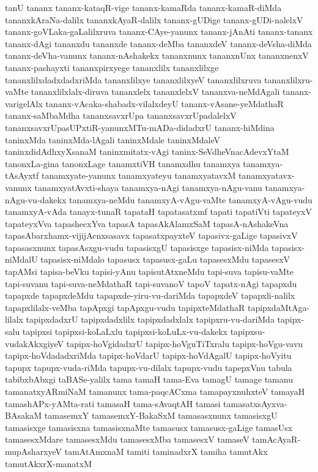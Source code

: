 {tanU
tananx
tananx-kataqR-vige
tananx-kamaRda
tananx-kamaR-diMda
tananxkAraNa-dalilx
tananxkAyaR-dalilx
tananx-gUDige
tananx-gUDi-nalelxV
tananx-goVLaka-gaLalilxruva
tananx-CAye-yanunx
tananx-jAnAti
tananx-tananx
tananx-dAgi
tananxdu
tananxde
tananx-deMba
tananxdeV
tananx-deVsha-diMda
tananx-deVha-vanunx
tananx-nAshakekx
tananxnunx
tananxnUnx
tananxnenxV
tananx-pashayxti
tananxpirxyege
tananxlilx
tananxlilxge
tananxlilxdadxdadxriMda
tananxlilxye
tananxlilxyeV
tananxlilxruva
tananxlilxru-vaMte
tananxlilxlalx-diruva
tananxlelx
tananxlelxV
tananxva-neMdAgali
tananx-varigelAlx
tananx-vAcaka-shabadx-vilalxdeyU
tananx-vAsane-yeMdathaR
tananx-saMbaMdha
tananxsavxrUpa
tananxsavxrUpadalelxV
tananxsavxrUpasUPxtiR-yanunxMTu-mADa-didadxrU
tananx-hiMdina
taninxMda
taninxMda-lAgali
taninxMdale
taninxMdaleV
taninxdidAdhxyXsanaM
taninxmitatx-vAgi
taninx-SeVdheVnacAdevxYtaM
tanonxLa-gina
tanonxLage
tanamxtiVH
tanamxdhu
tanamxya
tanamxya-tAsAyxtf
tanamxyate-yanunx
tanamxyateyu
tanamxyatavxM
tanamxyatavx-vanunx
tanamxyatAvxti-shaya
tanamxya-nAgi
tanamxya-nAgu-vanu
tanamxya-nAgu-vu-dakekx
tanamxya-neMdu
tanamxyA-vAgu-vaMte
tanamxyA-vAgu-vudu
tanamxyA-vAda
tanayx-tunaR
tapataH
tapatasatxmf
tapati
tapatiVti
tapateyxV
tapateyxVva
tapashecxYva
tapasA
tapasAkAlamxSaM
tapasA-nAshakeVna
tapasAbarxhamx-vijijAcnxsasavx
tapasatxpayxteV
tapasivx-gaLige
tapasivxV
tapasasxnunx
tapasAsxgu-vudu
tapasisxgU
tapasisxge
tapasisx-niMda
tapasisx-niMdalU
tapasisx-niMdalo
tapasusx
tapasusx-gaLu
tapasesxMdu
tapasesxV
tapAMsi
tapisa-beVku
tapisi-yAnu
tapisutAtxneMdu
tapi-suva
tapisu-vaMte
tapi-suvanu
tapi-suva-neMdathaR
tapi-suvanoV
tapoV
tapatx-nAgi
tapapxdu
tapapxde
tapapxdeMdu
tapapxde-yiru-vu-dariMda
tapapxdeV
tapapxli-nalilx
tapapxlilalx-veMba
tapApxgi
tapApxgu-vudu
tapipxteMdathaR
tapipxdaMtAga-lilalx
tapipxdadxrU
tapipxdadxlilx
tapipxdadxlalx
tapipxru-vu-dariMda
tapipx-salu
tapipxsi
tapipxsi-koLaLxlu
tapipxsi-koLuLx-vu-dakekx
tapipxsu-vudakAkxgiyeV
tapipx-hoVgidadxrU
tapipx-hoVguTiTxralu
tapipx-hoVgu-vavu
tapipx-hoVdadadxriMda
tapipx-hoVdarU
tapipx-hoVdAgalU
tapipx-hoVyitu
tapupx
tapupx-vuda-riMda
tapupx-vu-dilalx
tapupx-vudu
tapepxVnu
tabula
tabibxbAbxgi
taBASe-yalilx
tama
tamaH
tama-Eva
tamagU
tamage
tamanu
tamanatxyARmiNaM
tamanunx
tama-paqcACxma
tamapayxnuhxteV
tamayaH
tamashAPx-yAMta-rati
tamasaH
tama-sAvaqtAH
tamasi
tamasatxsAyxva-BAsakaM
tamasemxY
tamasemxY-BakaSxM
tamasasxnunx
tamasisxgU
tamasisxge
tamasisxna
tamasisxnaMte
tamasusx
tamasusx-gaLige
tamasUsx
tamasesxMdare
tamasesxMdu
tamasesxMba
tamasesxV
tamaseV
tamAcAyaR-mupAsharxyeV
tamAtAmxnaM
tamiti
taminadxrX
tamiha
tamutAkx
tamutAkxrX-manatxM
}
